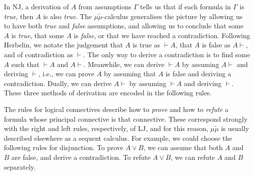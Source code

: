 In NJ, a derivation of $A$ from assumptions $\Gamma$ tells us that if each
formula in $\Gamma$ is \emph{true}, then $A$ is also \emph{true}.
The $\mu\tilde\mu$-calculus generalises the picture by allowing us to have
both \emph{true} and \emph{false} assumptions, and allowing us to conclude that
some $A$ is \emph{true}, that some $A$ is \emph{false}, or that we have reached
a contradiction.
Following Herbelin, we notate the judgement that $A$ is true as ${}\vdash A$,
that $A$ is false as $A \vdash{}$, and of contradiction as $\vdash$.
The only way to derive a contradiction is to find some $A$ such that
${}\vdash A$ and $A \vdash{}$.
Meanwhile, we can derive ${}\vdash A$ by assuming $A \vdash{}$ and deriving
$\vdash$, i.e., we can prove $A$ by assuming that $A$ is false and deriving a
contradiction.
Dually, we can derive $A \vdash{}$ by assuming ${}\vdash A$ and deriving
$\vdash$.
These three methods of derivation are encoded in the following rules.


The rules for logical connectives describe how to \emph{prove} and how to
\emph{refute} a formula whose principal connective is that connective.
These correspond strongly with the right and left rules, respectively, of LJ,
and for this reason, $\mu\tilde\mu$ is usually described elsewhere as a
sequent calculus.
For example, we could choose the following rules for disjunction.
To prove $A \vee B$, we can assume that both $A$ and $B$ are false, and derive
a contradiction.
To refute $A \vee B$, we can refute $A$ and $B$ separately.

